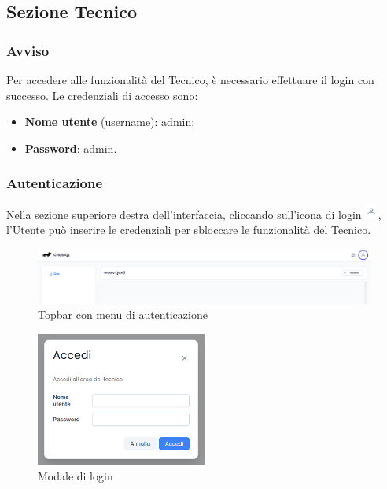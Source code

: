 \subsection{Sezione Tecnico}
\label{sec:sezTecnico}

\subsubsection*{Avviso}
\par Per accedere alle funzionalità del Tecnico, è necessario effettuare il login con successo. Le credenziali di accesso sono:
\begin{itemize}
    \item \textbf{Nome utente} (username): admin;
    \item \textbf{Password}: admin. 
\end{itemize}

\subsubsection{Autenticazione} \label{sec:autenticazione}
\par Nella sezione superiore destra dell'interfaccia, cliccando sull'icona di login \includegraphics[height=1.2em]{assets/user_icon.png}, l'Utente può inserire le credenziali per sbloccare le funzionalità del Tecnico.

\begin{figure}[H]
  \centering
  \includegraphics[width=\textwidth]{assets/login_topbar.png}
  \caption{Topbar con menu di autenticazione}
\end{figure}
\begin{figure}[H]
  \centering
  \includegraphics[width=0.50\textwidth]{assets/login_modal.png}
  \caption{Modale di login}
\end{figure}

